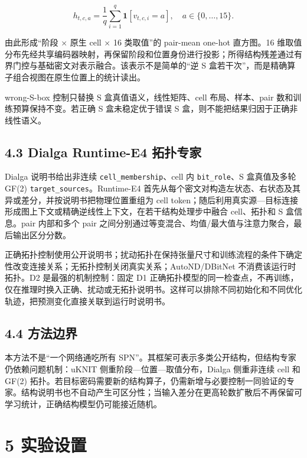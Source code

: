 \documentclass[
  a4paper,
  UTF8]{ctexart}
\begin{document}
\[
h_{t,c,a}=\frac{1}{q}\sum_{i=1}^{q}\mathbf 1[v_{t,c,i}=a],
\quad a\in\{0,\ldots,15\}.
\]

由此形成``阶段 × 原生 cell × 16 类取值''的 pair-mean one-hot 直方图。16
维取值分布先经共享编码器映射，再保留阶段和位置身份进行投影；所得结构残差通过有界门控与基础密文对表示融合。该表示不是简单的``逆
S 盒若干次''，而是精确算子组合视图在原生位置上的统计读出。

wrong-S-box 控制只替换 S 盒真值语义，线性矩阵、cell 布局、样本、pair
数和训练预算保持不变。若正确 S 盒未稳定优于错误 S
盒，则不能把结果归因于正确非线性语义。

\hypertarget{dialga-runtime-e4-ux62d3ux6251ux4e13ux5bb6}{%
\subsection{4.3 Dialga Runtime-E4
拓扑专家}\label{dialga-runtime-e4-ux62d3ux6251ux4e13ux5bb6}}

Dialga 说明书给出非连续 \texttt{cell\_membership}、cell 内
\texttt{bit\_role}、S 盒真值及多轮 GF(2)
\texttt{target\_sources}。Runtime-E4
首先从每个密文对构造左状态、右状态及其异或差分，并按说明书把物理位置重组为
cell
token；随后利用真实源---目标连接形成图上下文或精确逆线性上下文，在若干结构处理步中融合
cell、拓扑和 S 盒信息。pair 内部和多个 pair
之间分别通过等变混合、均值/最大值与注意力聚合，最后输出区分分数。

正确拓扑控制使用公开说明书；扰动拓扑在保持张量尺寸和训练流程的条件下确定性改变连接关系；无拓扑控制关闭真实关系；AutoND/DBitNet
不消费该运行时拓扑。D2 是最强的机制控制：固定 D1
正确拓扑模型的同一检查点，不再训练，仅在推理时换入正确、扰动或无拓扑说明书。这样可以排除不同初始化和不同优化轨迹，把预测变化直接关联到运行时说明书。

\hypertarget{ux65b9ux6cd5ux8fb9ux754c}{%
\subsection{4.4 方法边界}\label{ux65b9ux6cd5ux8fb9ux754c}}

本方法不是``一个网络通吃所有
SPN''。其框架可表示多类公开结构，但结构专家仍依赖问题机制：uKNIT
侧重阶段---位置---取值分布，Dialga 侧重非连续 cell 和 GF(2)
拓扑。若目标密码需要新的结构算子，仍需新增与必要控制一同验证的专家。结构说明书也不自动产生可区分性；当输入差分在更高轮数扩散后不再保留可学习统计，正确结构模型仍可能接近随机。

\hypertarget{ux5b9eux9a8cux8bbeux7f6e}{%
\section{5 实验设置}\label{ux5b9eux9a8cux8bbeux7f6e}}
\end{document}
